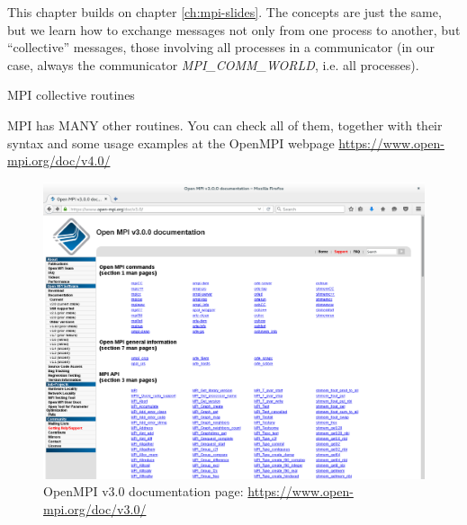 
This chapter builds on chapter \ref{ch:mpi-slides}. The concepts are just the
same, but we learn how to exchange messages not only from one process to
another, but ``collective'' messages, those involving all processes in a
communicator (in our case, always the communicator \textit{MPI\_COMM\_WORLD},
i.e. all processes).

 {MPI collective routines}
\label{sec:collective-mpi}



MPI has MANY other routines. You can check all of them, together with their
syntax and some usage examples at the OpenMPI webpage
\url{https://www.open-mpi.org/doc/v4.0/}

\begin{figure}[!htbp]
  \centering
  \includegraphics[width=\textwidth]{graphics/openmpi.png}
  \caption{OpenMPI v3.0 documentation page: \url{https://www.open-mpi.org/doc/v3.0/}}
\end{figure}


